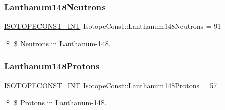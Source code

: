\subsubsection{\texorpdfstring{Lanthanum148\+Neutrons}{Lanthanum148Neutrons}}
{\footnotesize\ttfamily \mbox{\hyperlink{group___isotope_const-_macros_ga5f18360b3e99483a35c32d789e62621c}{I\+S\+O\+T\+O\+P\+E\+C\+O\+N\+S\+T\+\_\+\+I\+NT}} Isotope\+Const\+::\+Lanthanum148\+Neutrons = 91}

\$ \$ Neutrons in Lanthanum-\/148. \mbox{\label{group___isotope_const-_lanthanum-_la148_ga7ed66175a6c245f0605ebc61aa16052e}} 
\subsubsection{\texorpdfstring{Lanthanum148\+Protons}{Lanthanum148Protons}}
{\footnotesize\ttfamily \mbox{\hyperlink{group___isotope_const-_macros_ga5f18360b3e99483a35c32d789e62621c}{I\+S\+O\+T\+O\+P\+E\+C\+O\+N\+S\+T\+\_\+\+I\+NT}} Isotope\+Const\+::\+Lanthanum148\+Protons = 57}

\$ \$ Protons in Lanthanum-\/148. 